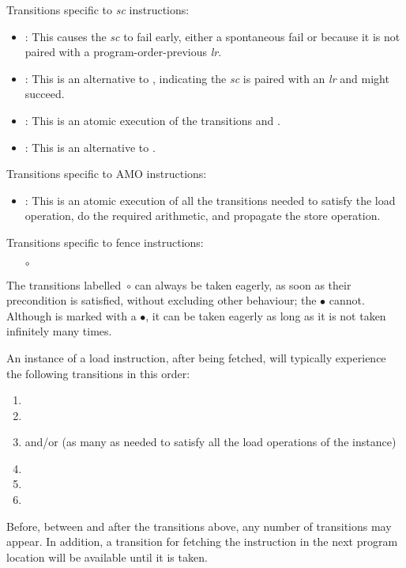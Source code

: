 \noindent Transitions specific to {\em  sc} instructions:
\begin{itemize}
\item {}: This causes the {\em sc} to fail early, either a spontaneous fail or because it is not paired with a program-order-previous {\em lr}.
\item {}: This is an alternative to , indicating the {\em sc} is paired with an {\em lr} and might succeed. 
\item {}: This is an atomic execution of the transitions  and .
\item {}: This is an alternative to . 
\end{itemize}

\noindent Transitions specific to AMO instructions:
\begin{itemize}
\item {}: This is an atomic execution of all the transitions needed to satisfy the load operation, do the required arithmetic, and propagate the store operation.
\end{itemize}

\noindent Transitions specific to fence instructions:
\begin{itemize}
\item[$\circ$] 
\end{itemize}

The transitions labelled~$\circ$ can always be taken eagerly, as soon as their precondition is satisfied, without excluding other behaviour; the $\bullet$ cannot.
Although  is marked with a $\bullet$, it can be taken eagerly as long as it is not taken infinitely many times.

An instance of a load instruction, after being fetched, will typically experience the following transitions in this order:
\begin{enumerate}
\item {}
\item {}
\item {} and/or  (as many as needed to satisfy all the load operations of the instance)
\item {}
\item {}
\item {}
\end{enumerate}
Before, between and after the transitions above, any number of  transitions may appear.
In addition, a  transition for fetching the instruction in the next program location will be available until it is taken.


